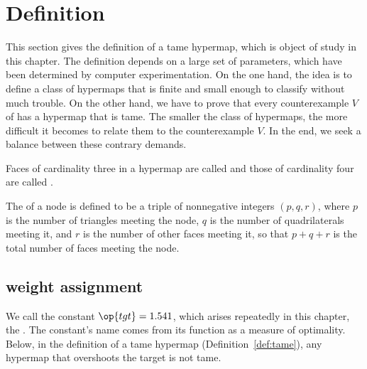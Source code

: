 \section{Definition}

This section gives the definition of a tame hypermap, which is object of study in
this chapter.    The definition depends on a large set of parameters, which have
been determined by computer experimentation.  On the one hand, the idea is to define a class
of hypermaps that is finite and small enough to classify without much trouble.
On the other hand, we have to prove that every counterexample $V$ of 
has a hypermap that is tame.  The smaller the class of hypermaps, the more difficult
it becomes to relate them to the counterexample $V$.  In the end, we seek a balance
between these contrary demands.


\begin{definition}
  Faces of cardinality three in a hypermap are called
   and those of cardinality four are called
  .
%
%
%
%
\end{definition}

\begin{definition}[type,~$(p,q,r)$]\label{definition:type}
The  of a node is defined to be a triple of
nonnegative integers $(p,q,r)$, where $p$ is the number of
triangles meeting the node, $q$ is the number of quadrilaterals
meeting it, and $r$ is the number of other faces meeting it, so that
$p+q+r$ is the total number of faces meeting the node.
%
%
%
\end{definition}


\subsection{weight assignment}\label{sec:wtassign}
%

We call the constant $\op{tgt}=1.541$, which arises repeatedly in this
chapter, the .  The constant's name comes from its
function as a measure of optimality. Below, in the definition of a tame
hypermap (Definition~\ref{def:tame}), any hypermap that overshoots the
target is not tame.  
%
%
%


